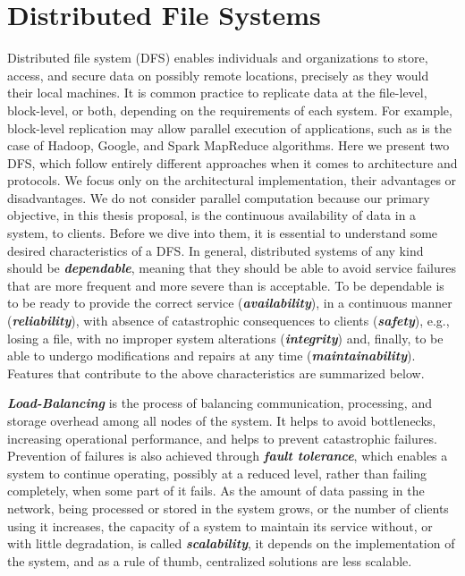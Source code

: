 \documentclass[runningheads]{llncs}
\begin{document}
\newpage\section{Distributed File Systems}\label{sec:relatedwork}
Distributed file system (DFS) enables individuals and organizations to store, access, and secure data on possibly remote locations, precisely as they would their local machines. It is common practice to replicate data at the file-level, block-level, or both, depending on the requirements of each system. For example, block-level replication may allow parallel execution of applications, such as is the case of Hadoop, Google, and Spark MapReduce algorithms. Here we present two DFS, which follow entirely different approaches when it comes to architecture and protocols. We focus only on the architectural implementation, their advantages or disadvantages. We do not consider parallel computation because our primary objective, in this thesis proposal, is the continuous availability of data in a system, to clients. Before we dive into them, it is essential to understand some desired characteristics of a DFS. In general, distributed systems of any kind should be \textbf{\textit{dependable}}, meaning that they should be able to avoid service failures that are more frequent and more severe than is acceptable. To be dependable is to be ready to provide the correct service (\textbf{\textit{availability}}), in a continuous manner (\textbf{\textit{reliability}}), with absence of catastrophic consequences to clients (\textbf{\textit{safety}}), e.g., losing a file, with no improper system alterations (\textbf{\textit{integrity}}) and, finally, to be able to undergo modifications and repairs at any time (\textbf{\textit{maintainability}}). Features that contribute to the above characteristics are summarized below.

\textbf{\textit{Load-Balancing}} is the process of balancing communication, processing, and storage overhead among all nodes of the system. It helps to avoid bottlenecks, increasing operational performance, and helps to prevent catastrophic failures. Prevention of failures is also achieved through \textbf{\textit{fault tolerance}}, which enables a system to continue operating, possibly at a reduced level,  rather  than failing completely,  when some part of it fails. As the amount of data passing in the network, being processed or stored in the system grows, or the number of clients using it increases, the capacity of a system to maintain its service without, or with little degradation, is called \textbf{\textit{scalability}}, it depends on the implementation of the system, and as a rule of thumb, centralized solutions are less scalable.
\end{document}
